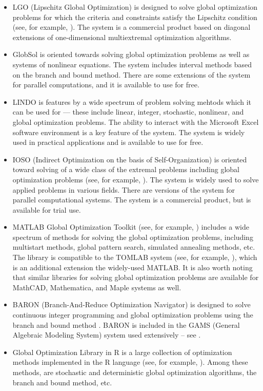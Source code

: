 \documentclass{gOMS2e}
\theoremstyle{plain}%
\theoremstyle{definition}
\theoremstyle{remark}
\begin{document}
\begin{itemize}
\item LGO (Lipschitz Global Optimization) is designed to solve global optimization
problems for which the criteria and constraints satisfy the Lipschitz condition (see, for example, \cite{pinterGO}).
The system is a commercial product based on diagonal extensions of one-dimensional
multiextremal optimization algorithms.
\item GlobSol \cite{kearfott2009} is oriented towards solving global optimization problems as well as
systems of nonlinear equations. The system includes interval methods based on the branch and
bound method. There are some extensions of the system for parallel computations, and it is available to use for free.
\item LINDO \cite{linSchrage2009} is features by a wide spectrum of problem solving mehtods which
it can be used for --- these include linear, integer, stochastic, nonlinear, and global
optimization problems. The ability to interact with the Microsoft Excel software
environment is a key feature of the system. The system is widely used in practical
applications and is available to use for free.
\item IOSO (Indirect Optimization on the basis of Self-Organization) is oriented
toward solving of a wide class of the extremal problems including global optimization
problems (see, for example, \cite{iosoDescription}). The system is widely used to
solve applied problems in various fields. There are versions of the system for parallel
computational systems. The system is a commercial product, but is available for trial use.
\item MATLAB Global Optimization Toolkit (see, for example, \cite{venkataraman2009}) includes a wide spectrum
of methods for solving the global optimization problems, including multistart methods,
global pattern search, simulated annealing methods, etc. The library is compatible to the
TOMLAB system (see, for example, \cite{holmstromEdvall2004}), which is an additional extension the widely-used MATLAB.
It is also worth noting that similar libraries for solving global optimization problems are
available for MathCAD, Mathematica, and Maple systems as well.
\item BARON (Branch-And-Reduce Optimization Navigator) is designed to solve continuous
integer programming and global optimization problems using the branch and bound method \cite{sahinidis1996}.
BARON is included in the GAMS (General Algebraic Modeling System) system used extensively – see \cite{bussieckMeeraus2004}.
\item Global Optimization Library in R is a large collection of optimization methods
implemented in the R language (see, for example, \cite{mullen2014}). Among these methods, are stochastic and deterministic global optimization algorithms,
the branch and bound method, etc.
\end{itemize}
\end{document}
